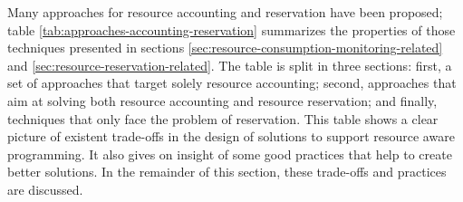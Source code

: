 Many approaches for resource accounting and reservation have been proposed; table \ref{tab:approaches-accounting-reservation} summarizes the properties of those techniques presented in sections \ref{sec:resource-consumption-monitoring-related} and \ref{sec:resource-reservation-related}.
The table is split in three sections: first, a set of approaches that target solely resource accounting; second, approaches that aim at solving both resource accounting and resource reservation; and finally, techniques that only face the problem of reservation.
This table shows a clear picture of existent trade-offs in the design of solutions to support resource aware programming.
It also gives on insight of some good practices that help to create better solutions.
In the remainder of this section, these trade-offs and practices are discussed.

